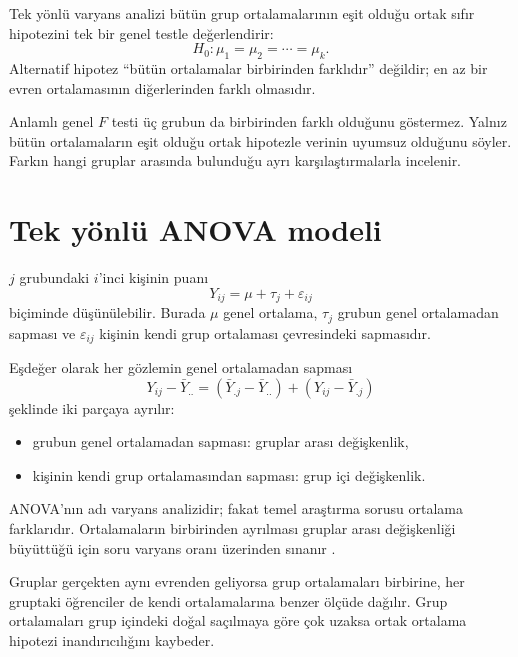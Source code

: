 Tek yönlü varyans analizi bütün grup ortalamalarının eşit olduğu ortak sıfır
hipotezini tek bir genel testle değerlendirir:
\[
H_0:\mu_1=\mu_2=\cdots=\mu_k.
\]
Alternatif hipotez ``bütün ortalamalar birbirinden farklıdır'' değildir; en az
bir evren ortalamasının diğerlerinden farklı olmasıdır.

\begin{mistakebox}
Anlamlı genel $F$ testi üç grubun da birbirinden farklı olduğunu göstermez.
Yalnız bütün ortalamaların eşit olduğu ortak hipotezle verinin uyumsuz
olduğunu söyler. Farkın hangi gruplar arasında bulunduğu ayrı karşılaştırmalarla
incelenir.
\end{mistakebox}

\section{Tek yönlü ANOVA modeli}

$j$ grubundaki $i$'inci kişinin puanı
\[
Y_{ij}=\mu+\tau_j+\varepsilon_{ij}
\]
biçiminde düşünülebilir. Burada $\mu$ genel ortalama, $\tau_j$ grubun genel
ortalamadan sapması ve $\varepsilon_{ij}$ kişinin kendi grup ortalaması
çevresindeki sapmasıdır.

Eşdeğer olarak her gözlemin genel ortalamadan sapması
\[
Y_{ij}-\bar Y_{..}
=\left(\bar Y_{.j}-\bar Y_{..}\right)
+\left(Y_{ij}-\bar Y_{.j}\right)
\]
şeklinde iki parçaya ayrılır:

\begin{itemize}
  \item grubun genel ortalamadan sapması: gruplar arası değişkenlik,
  \item kişinin kendi grup ortalamasından sapması: grup içi değişkenlik.
\end{itemize}

ANOVA'nın adı varyans analizidir; fakat temel araştırma sorusu ortalama
farklarıdır. Ortalamaların birbirinden ayrılması gruplar arası değişkenliği
büyüttüğü için soru varyans oranı üzerinden sınanır
\cite{maxwell2018,kutner2005}.

\begin{sezgibox}
Gruplar gerçekten aynı evrenden geliyorsa grup ortalamaları birbirine, her
gruptaki öğrenciler de kendi ortalamalarına benzer ölçüde dağılır. Grup
ortalamaları grup içindeki doğal saçılmaya göre çok uzaksa ortak ortalama
hipotezi inandırıcılığını kaybeder.
\end{sezgibox}

